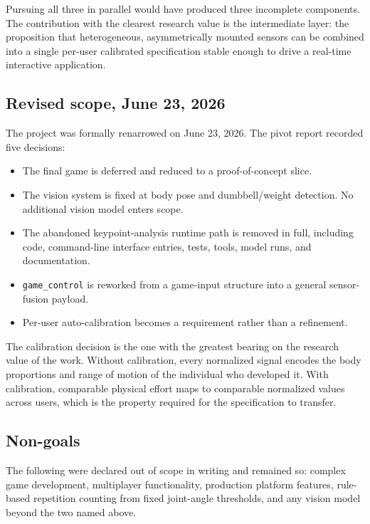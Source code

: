 \documentclass[11pt,a4paper]{article}
\newcommand{\code}[1]{\texttt{\small #1}}
\begin{document}
Pursuing all three in parallel would have produced three incomplete components.
The contribution with the clearest research value is the intermediate layer: the
proposition that heterogeneous, asymmetrically mounted sensors can be combined
into a single per-user calibrated specification stable enough to drive a
real-time interactive application.

\subsection{Revised scope, June 23, 2026}

The project was formally renarrowed on June 23, 2026. The pivot report recorded
five decisions:

\begin{itemize}
\item The final game is deferred and reduced to a proof-of-concept slice.
\item The vision system is fixed at body pose and dumbbell/weight detection. No
      additional vision model enters scope.
\item The abandoned keypoint-analysis runtime path is removed in full, including
      code, command-line interface entries, tests, tools, model runs, and
      documentation.
\item \code{game\_control} is reworked from a game-input structure into a general
      sensor-fusion payload.
\item Per-user auto-calibration becomes a requirement rather than a refinement.
\end{itemize}

The calibration decision is the one with the greatest bearing on the research
value of the work. Without calibration, every normalized signal encodes the body
proportions and range of motion of the individual who developed it. With
calibration, comparable physical effort maps to comparable normalized values
across users, which is the property required for the specification to transfer.

\subsection{Non-goals}

The following were declared out of scope in writing and remained so:
complex game development, multiplayer functionality, production platform
features, rule-based repetition counting from fixed joint-angle thresholds, and
any vision model beyond the two named above.
\end{document}
